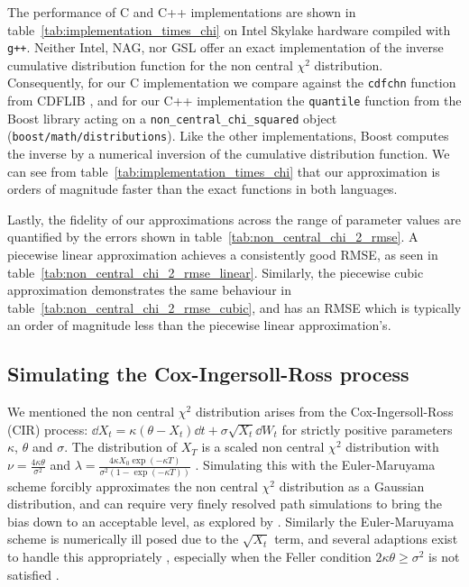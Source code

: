 \documentclass[manuscript,review]{acmart}
\begin{document}
The performance of C and C++ implementations are shown in table~\ref{tab:implementation_times_chi} on Intel Skylake hardware compiled with \texttt{g++}. Neither Intel, NAG, nor GSL offer an exact implementation of the inverse cumulative distribution function for the non central $ \chi^2 $ distribution. Consequently, for our C implementation we compare against the \texttt{cdfchn} function from CDFLIB \citep{brown1994dcdflib,burkardt2020cdflib}, and for our C++ implementation the \texttt{quantile} function from the Boost library \citep{boost2020library} acting on a \texttt{non\_central\_chi\_squared} object (\texttt{boost/math/distributions}). Like the other implementations, Boost computes the inverse by a numerical inversion of the cumulative distribution function. We can see from table~\ref{tab:implementation_times_chi} that our approximation is orders of magnitude faster than the exact functions in both languages. 


Lastly, the fidelity of our approximations across the range of parameter values are quantified by the errors shown in table~\ref{tab:non_central_chi_2_rmse}. A piecewise linear approximation achieves a consistently good RMSE, as seen in table~\ref{tab:non_central_chi_2_rmse_linear}. Similarly, the piecewise cubic approximation demonstrates the same behaviour in table~\ref{tab:non_central_chi_2_rmse_cubic}, and has an RMSE which is typically an order of magnitude less than the piecewise linear approximation's. 

\subsection{Simulating the Cox-Ingersoll-Ross process}

We mentioned the non central $ \chi^2 $ distribution arises from the Cox-Ingersoll-Ross (CIR) process: $ \dd{X_t} = \kappa (\theta - X_t) \dd{t} + \sigma \sqrt{X_t} \dd{W_t} $ for strictly positive parameters $ \kappa $, $ \theta $ and $ \sigma $. The distribution of $ X_T $ is a scaled non central $ \chi^2 $ distribution with $ \nu = \tfrac{4\kappa\theta}{\sigma^2} $ and $ \lambda = \tfrac{4\kappa X_0 \exp(-\kappa T)}{\sigma^2(1 - \exp(-\kappa T))} $ \citep{cox1985theory} \citep[pages~67--68]{munk2011fixed}. Simulating this with the Euler-Maruyama scheme forcibly approximates the non central $ \chi^2 $ distribution as a Gaussian distribution, and can require very finely resolved path simulations to bring the bias down to an acceptable level, as explored by \citet{broadie2006exact}. Similarly the Euler-Maruyama scheme is numerically ill posed due to the $ \sqrt{X_t} $ term, and several adaptions exist to handle this appropriately \citep{deelstra1998convergence,lord2010comparison,berkaoui2008euler,higham2002strong,alfonsi2005discretization,alfonsi2008second,alfonsi2010high,dereich2012euler,cozma2020strong_euler,gyongy2011note}, especially when the Feller condition $ 2\kappa\theta \geq \sigma^2 $ is not satisfied \citep{feller1951two,gyongy1998note}.
\end{document}
